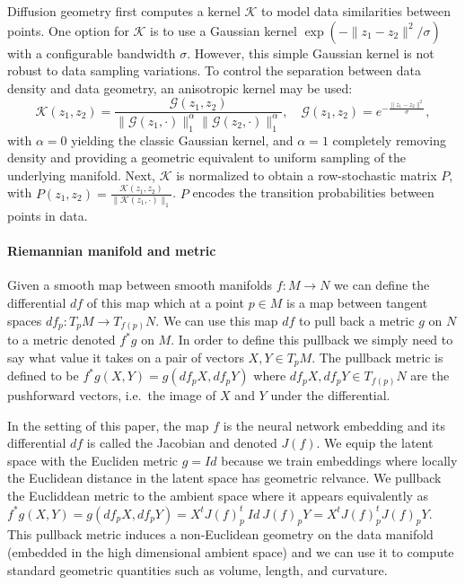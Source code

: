 \documentclass{article}
\theoremstyle{plain}
\theoremstyle{definition}
\theoremstyle{remark}
\begin{document}
Diffusion geometry first computes a kernel $\mathcal{K}$ to model data similarities between points. One option for $\mathcal{K}$ is to use a Gaussian kernel $\exp (-\|z_1 - z_2\|^2 / \sigma)$ with a configurable bandwidth $\sigma$. However, this simple Gaussian kernel is not robust to data sampling variations. To control the separation between data density and data geometry, an anisotropic kernel may be used:
\begin{equation}
\label{eqn:diffusion_kernel}
\mathcal{K}(z_1, z_2) = \frac{\mathcal{G}(z_1, z_2)}{\|\mathcal{G}(z_1, \cdot)\|_1^{\alpha} \|\mathcal{G}(z_2,\cdot)\|_1^{\alpha}}, \quad \mathcal{G}(z_1, z_2) = e^{-\frac{\|z_1 - z_2\|^2}{\sigma}},    
\end{equation}
with $\alpha = 0$ yielding the classic Gaussian kernel, and $\alpha = 1$ completely removing density and providing a geometric equivalent to uniform sampling of the underlying manifold. Next, $\mathcal{K}$ is normalized to obtain a row-stochastic matrix $P$, with $P(z_1, z_2) = \frac{\mathcal{K}(z_1, z_2)}{\|\mathcal{K}(z_1, \cdot)\|_1}$. $P$ encodes the transition probabilities between points in data.
 
 
 
\paragraph{Riemannian manifold and metric}


Given a smooth map between smooth manifolds $f \colon M \to N$ we can define the differential $df$ of this map which at a point $p\in M$ is a map between tangent spaces $df_p \colon T_pM \to T_{f(p)} N$. We can use this map $df$ to pull back a metric $g$ on $N$ to a metric denoted $f^*g$ on $M$. In order to define this pullback we simply need to say what value it takes on a pair of vectors $X,Y \in T_pM$. The pullback metric is defined to be $f^*g(X,Y)= g(df_pX,df_pY )$ where $df_pX,df_pY  \in T_{f(p)} N$ are the pushforward vectors, i.e.~the image of $X$ and $Y$ under the differential. 


In the setting of this paper, the map $f$ is the neural network embedding and its differential $df$ is called the Jacobian and denoted $J(f)$. We equip the latent space with the Eucliden metric $g=Id$ because we train embeddings where locally the Euclidean distance in the latent space has geometric relvance. We pullback the Eucliddean metric to the ambient space where it appears equivalently as $f^*g(X,Y)= g(df_pX,df_pY )= X^t J(f)^t_p ~Id~ J(f)_p Y = X^t J(f)^t_p J(f)_p Y$. This pullback metric induces a non-Euclidean geometry on the data manifold (embedded in the high dimensional ambient space) and we can use it to compute standard geometric quantities such as volume, length, and curvature. 
\end{document}

